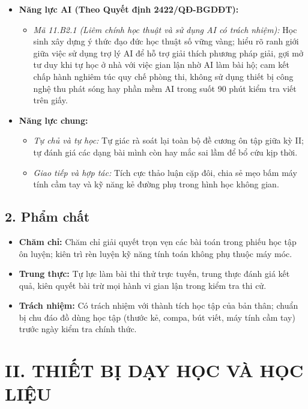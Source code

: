 \documentclass[12pt, a4paper]{article}
\begin{document}
\begin{itemize}[leftmargin=1.2cm]
    \item \textbf{Năng lực AI (Theo Quyết định 2422/QĐ-BGDĐT):}
    \begin{itemize}[leftmargin=0.6cm]
        \item \textit{Mã 11.B2.1 (Liêm chính học thuật và sử dụng AI có trách nhiệm):} Học sinh xây dựng ý thức đạo đức học thuật số vững vàng; hiểu rõ ranh giới giữa việc sử dụng trợ lý AI để hỗ trợ giải thích phương pháp giải, gợi mở tư duy khi tự học ở nhà với việc gian lận nhờ AI làm bài hộ; cam kết chấp hành nghiêm túc quy chế phòng thi, không sử dụng thiết bị công nghệ thu phát sóng hay phần mềm AI trong suốt 90 phút kiểm tra viết trên giấy.
    \end{itemize}

    \item \textbf{Năng lực chung:}
    \begin{itemize}[leftmargin=0.6cm]
        \item \textit{Tự chủ và tự học:} Tự giác rà soát lại toàn bộ đề cương ôn tập giữa kỳ II; tự đánh giá các dạng bài mình còn hay mắc sai lầm để bổ cứu kịp thời.
        \item \textit{Giao tiếp và hợp tác:} Tích cực thảo luận cặp đôi, chia sẻ mẹo bấm máy tính cầm tay và kỹ năng kẻ đường phụ trong hình học không gian.
    \end{itemize}
\end{itemize}

\subsection*{2. Phẩm chất}

\begin{itemize}[leftmargin=1.2cm]
    \item \textbf{Chăm chỉ:} Chăm chỉ giải quyết trọn vẹn các bài toán trong phiếu học tập ôn luyện; kiên trì rèn luyện kỹ năng tính toán không phụ thuộc máy móc.
    \item \textbf{Trung thực:} Tự lực làm bài thi thử trực tuyến, trung thực đánh giá kết quả, kiên quyết bài trừ mọi hành vi gian lận trong kiểm tra thi cử.
    \item \textbf{Trách nhiệm:} Có trách nhiệm với thành tích học tập của bản thân; chuẩn bị chu đáo đồ dùng học tập (thước kẻ, compa, bút viết, máy tính cầm tay) trước ngày kiểm tra chính thức.
\end{itemize}

\section*{II. THIẾT BỊ DẠY HỌC VÀ HỌC LIỆU}
\end{document}
